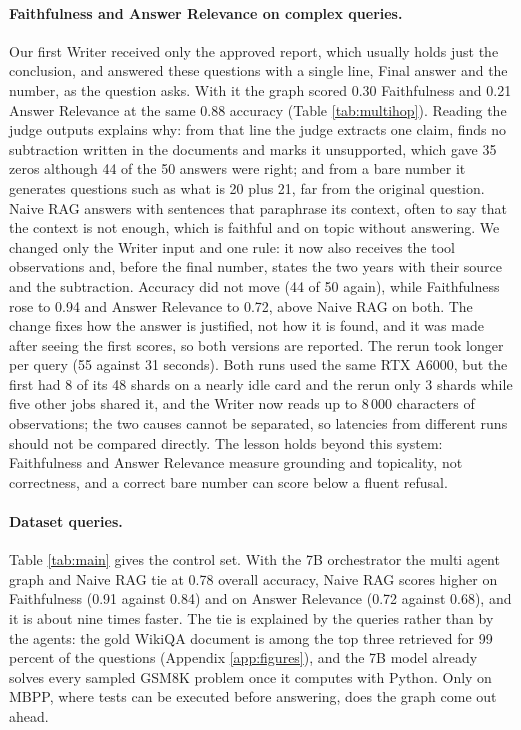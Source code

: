 \documentclass{article}
\begin{document}
\paragraph{Faithfulness and Answer Relevance on complex queries.}
Our first Writer received only the approved report, which usually holds just the conclusion, and answered these questions with a single line, Final answer and the number, as the question asks. With it the graph scored 0.30 Faithfulness and 0.21 Answer Relevance at the same 0.88 accuracy (Table \ref{tab:multihop}). Reading the judge outputs explains why: from that line the judge extracts one claim, finds no subtraction written in the documents and marks it unsupported, which gave 35 zeros although 44 of the 50 answers were right; and from a bare number it generates questions such as what is 20 plus 21, far from the original question. Naive RAG answers with sentences that paraphrase its context, often to say that the context is not enough, which is faithful and on topic without answering. We changed only the Writer input and one rule: it now also receives the tool observations and, before the final number, states the two years with their source and the subtraction. Accuracy did not move (44 of 50 again), while Faithfulness rose to 0.94 and Answer Relevance to 0.72, above Naive RAG on both. The change fixes how the answer is justified, not how it is found, and it was made after seeing the first scores, so both versions are reported. The rerun took longer per query (55 against 31 seconds). Both runs used the same RTX A6000, but the first had 8 of its 48 shards on a nearly idle card and the rerun only 3 shards while five other jobs shared it, and the Writer now reads up to 8\,000 characters of observations; the two causes cannot be separated, so latencies from different runs should not be compared directly. The lesson holds beyond this system: Faithfulness and Answer Relevance measure grounding and topicality, not correctness, and a correct bare number can score below a fluent refusal.



\paragraph{Dataset queries.}
Table \ref{tab:main} gives the control set. With the 7B orchestrator the multi agent graph and Naive RAG tie at 0.78 overall accuracy, Naive RAG scores higher on Faithfulness (0.91 against 0.84) and on Answer Relevance (0.72 against 0.68), and it is about nine times faster. The tie is explained by the queries rather than by the agents: the gold WikiQA document is among the top three retrieved for 99 percent of the questions (Appendix \ref{app:figures}), and the 7B model already solves every sampled GSM8K problem once it computes with Python. Only on MBPP, where tests can be executed before answering, does the graph come out ahead.
\end{document}
